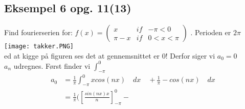 \documentclass[11pt,fleqn]{book} %
\begin{document}
\subsection{Eksempel 6 opg. 11(13)}
Find fourierserien for: $f(x)=\begin{pmatrix}
x & if &-\pi<0 \\ 
 \pi-x&if  & 0<x<\pi
\end{pmatrix}$ . Perioden er $2 \pi $\\
\texttt{[image: takker.PNG]}\\
ed at kigge på figuren ses det at gennemsnittet er 0! Derfor siger vi $a_0=0$ \\
$a_n$ udregnes. Først finder vi $\int_{- \pi}^0$
\begin{equation}
\begin{split}
a_0 &=\frac{1}{\pi}\int_{- \pi}^{0}xcos(nx)\quad dx \quad + \frac{1}{\pi}-cos(nx)\quad dx\\
&=\frac{1}{\pi}( \left [  \frac{sin(nx)x}{n}   \right ]_{- \pi}^0-
\end{split}
\end{equation}


\begin{thebibliography}{9}


          

     



\end{thebibliography}


   
\end{document}
